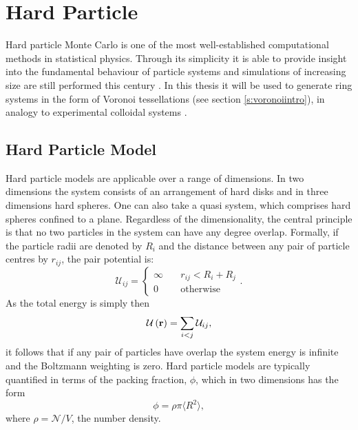 \section{Hard Particle \mc}
\label{s:hardparticlemc}

Hard particle Monte Carlo is one of the most well\--established computational methods in statistical physics.
Through its simplicity it is able to provide insight into the fundamental behaviour of particle systems and simulations of increasing size are still performed this century \cite{Isobe2016,Bernard2009,Anderson2013,Isobe2015}.
In this thesis it will be used to generate ring systems in the form of Voronoi tessellations (see section \ref{s:voronoiintro}), in analogy to experimental colloidal systems \cite{Thorneywork2017}.

\subsection{Hard Particle Model}
\label{s:hardparticlemodelintro}

Hard particle models are applicable over a range of dimensions.
In two dimensions the system consists of an arrangement of hard disks and in three dimensions hard spheres.
One can also take a quasi \td{} system, which comprises hard spheres confined to a plane.
Regardless of the dimensionality, the central principle is that no two particles in the system can have any degree overlap.
Formally, if the particle radii are denoted by $R_i$ and the distance between any pair of particle centres by $r_{ij}$, the pair potential is:
\begin{equation}
	\mathcal{U}_{ij} = \begin{cases}
	\infty \quad &r_{ij}<R_i+R_j \\
	0 \quad &\text{otherwise} %
	\end{cases} .
\end{equation}
As the total energy is simply then
\begin{equation}
	\mathcal{U}\left(\mathbf{r}\right) = \sum_{i<j} \mathcal{U}_{ij},
\end{equation}
it follows that if any pair of particles have overlap the system energy is infinite and the Boltzmann weighting is zero.
Hard particle models are typically quantified in terms of the packing fraction, $\phi$, which in two dimensions has the form
\begin{equation}
	\label{eq:packingfraction}
	\phi = \rho\pi\langle R^2\rangle,
\end{equation}
where $\rho=\mathcal{N}/{V}$, the number density.


